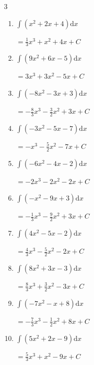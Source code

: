 \begin{multicols}{3}
\begin{enumerate}
        $\displaystyle =-\frac{2}{3}x^{3}-4x^{2}-3x+ C$

  \item $\displaystyle \int \left( x^{2}+2x+4 \right) \mathrm{d}x$

        $\displaystyle =\frac{1}{3}x^{3}+x^{2}+4x+ C$

  \item $\displaystyle \int \left( 9x^{2}+6x-5 \right) \mathrm{d}x$

        $\displaystyle =3x^{3}+3x^{2}-5x+ C$

  \item $\displaystyle \int \left( -8x^{2}-3x+3 \right) \mathrm{d}x$

        $\displaystyle =-\frac{8}{3}x^{3}-\frac{3}{2}x^{2}+3x+ C$

  \item $\displaystyle \int \left( -3x^{2}-5x-7 \right) \mathrm{d}x$

        $\displaystyle =-x^{3}-\frac{5}{2}x^{2}-7x+ C$

  \item $\displaystyle \int \left( -6x^{2}-4x-2 \right) \mathrm{d}x$

        $\displaystyle =-2x^{3}-2x^{2}-2x+ C$

  \item $\displaystyle \int \left( -x^{2}-9x+3 \right) \mathrm{d}x$

        $\displaystyle =-\frac{1}{3}x^{3}-\frac{9}{2}x^{2}+3x+ C$

\columnbreak %

  \item $\displaystyle \int \left( 4x^{2}-5x-2 \right) \mathrm{d}x$

        $\displaystyle =\frac{4}{3}x^{3}-\frac{5}{2}x^{2}-2x+ C$

  \item $\displaystyle \int \left( 8x^{2}+3x-3 \right) \mathrm{d}x$

        $\displaystyle =\frac{8}{3}x^{3}+\frac{3}{2}x^{2}-3x+ C$

  \item $\displaystyle \int \left( -7x^{2}-x+8 \right) \mathrm{d}x$

        $\displaystyle =-\frac{7}{3}x^{3}-\frac{1}{2}x^{2}+8x+ C$

  \item $\displaystyle \int \left( 5x^{2}+2x-9 \right) \mathrm{d}x$

        $\displaystyle =\frac{5}{3}x^{3}+x^{2}-9x+ C$


\end{enumerate}
\end{multicols}
